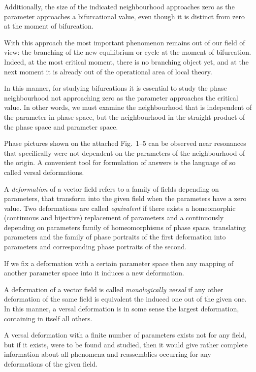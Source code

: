 \documentclass[12pt]{amsart}
\begin{document}
Additionally, the size of the indicated neighbourhood approaches zero as the
parameter approaches a bifurcational value, even though it is distinct from zero
at the moment of bifurcation.

With this approach the most important phenomenon remains out of our field of
view: the branching of the new equilibrium or cycle at the moment of
bifurcation.
Indeed, at the most critical moment, there is no branching object yet, and at
the next moment it is already out of the operational area of local theory.

In this manner, for studying bifurcations it is essential to study the phase
neighbourhood not approaching zero as the parameter approaches the critical
value.
In other words, we must examine the neighbourhood that is independent of the
parameter in phase space, but the neighbourhood in the straight product of the
phase space and parameter space.

Phase pictures shown on the attached Fig.~1--5 can be observed near resonances
that specifically were not dependent on the parameters of the neighbourhood of
the origin.
A convenient tool for formulation of answers is the language of so called versal
deformations.

A \textit{deformation} of a vector field refers to a family of fields depending
on parameters, that transform into the given field when the parameters have a
zero value.
Two deformations are called \textit{equivalent} if there exists a homeomorphic
(continuous and bijective) replacement of parameters and a continuously
depending on parameters family of homeomorphisms of phase space,
translating parameters and the family of phase portraits of the first
deformation into parameters and corresponding phase portraits of the second.

If we fix a deformation with a certain parameter space then any mapping of
another parameter space into it induces a new deformation.

A deformation of a vector field is called \textit{monologically versal} if any
other deformation of the same field is equivalent the induced one out of the
given one.
In this manner, a versal deformation is in some sense the largest deformation,
containing in itself all others.

A versal deformation with a finite number of parameters exists not for any
field, but if it exists, were to be found and studied, then it would give rather
complete information about all phenomena and reassemblies occurring for any
deformations of the given field.
\end{document}
